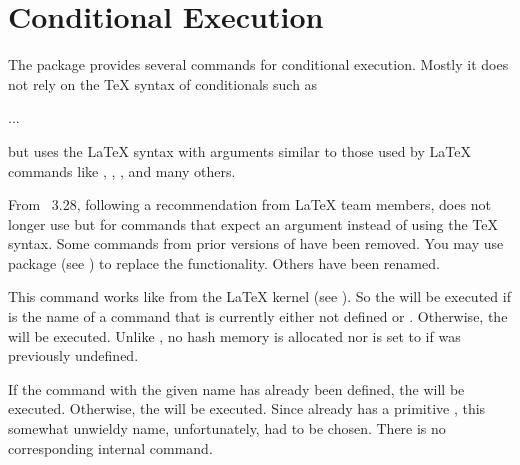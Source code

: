 %
\EndIndexGroup


\section{Conditional Execution}

The  package provides several commands for conditional
execution. Mostly it does not rely on the \TeX{} syntax of conditionals such
as
\begin{lstcode}
  \iftrue
    ...
  \else
    ...
  \fi
\end{lstcode}
but uses the \LaTeX{} syntax with arguments similar to those used by \LaTeX{}
commands like , ,
, and many others.

From \KOMAScript~3.28, following a recommendation from \LaTeX{} team members,
 does not longer use  but  for
commands that expect an argument instead of using the \TeX{}
syntax. Some commands from prior versions of \KOMAScript{} have been
removed. You may use package  (see \cite{package:iftex}) to
replace the functionality. Others have been renamed.

\begin{Declaration}
\end{Declaration}
This command works like
 from the \LaTeX{} kernel (see \cite{latex:source2e}). So
the  will be executed if  is the name of a
command that is currently either not defined or . Otherwise, the
 will be executed. Unlike , no hash
memory is allocated nor is  set to  if
 was previously undefined.%
\EndIndexGroup

\begin{Declaration}
\end{Declaration}
If the command with the given name has
already been defined, the  will be executed. Otherwise, the
 will be executed.  Since \eTeX{} already has a primitive
, this somewhat unwieldy name, unfortunately, had to be
chosen. There is no corresponding internal command.%
\EndIndexGroup

